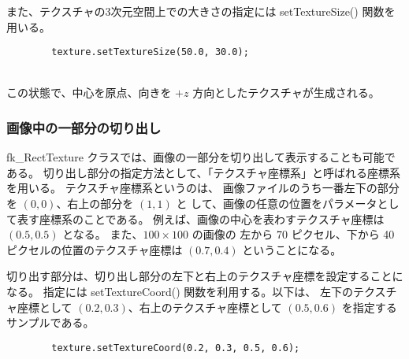 また、テクスチャの3次元空間上での大きさの指定には setTextureSize()
関数を用いる。
\\
\begin{screen}
\begin{verbatim}
        texture.setTextureSize(50.0, 30.0);
\end{verbatim}
\end{screen}
~ \\
この状態で、中心を原点、向きを \(+z\) 方向としたテクスチャが生成される。

\subsubsection{画像中の一部分の切り出し}
fk\_RectTexture クラスでは、画像の一部分を切り出して表示することも可能である。
切り出し部分の指定方法として、「テクスチャ座標系」と呼ばれる座標系を用いる。
テクスチャ座標系というのは、
画像ファイルのうち一番左下の部分を \((0, 0)\)、右上の部分を \((1, 1)\) と
して、画像の任意の位置をパラメータとして表す座標系のことである。
例えば、画像の中心を表わすテクスチャ座標は \((0.5, 0.5)\) となる。
また、\(100 \times 100\) の画像の
左から 70 ピクセル、下から 40 ピクセルの位置のテクスチャ座標は
\((0.7, 0.4)\) ということになる。

切り出す部分は、切り出し部分の左下と右上のテクスチャ座標を設定することになる。
指定には setTextureCoord() 関数を利用する。以下は、
左下のテクスチャ座標として \((0.2, 0.3)\)、右上のテクスチャ座標として
\((0.5, 0.6)\) を指定するサンプルである。
\\
\begin{screen}
\begin{verbatim}
        texture.setTextureCoord(0.2, 0.3, 0.5, 0.6);
\end{verbatim}
\end{screen}

